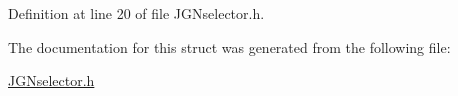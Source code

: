 Definition at line 20 of file J\+G\+Nselector.\+h.



The documentation for this struct was generated from the following file\+:\begin{DoxyCompactItemize}
\item 
\hyperlink{_j_g_nselector_8h}{J\+G\+Nselector.\+h}\end{DoxyCompactItemize}
